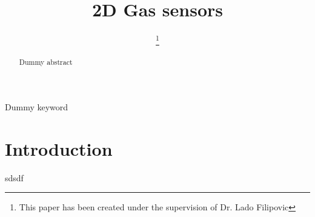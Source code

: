 \documentclass[conference]{IEEEtran}
\begin{document}
\title{2D Gas sensors}

\author{
\thanks{This paper has been created under the supervision of Dr. Lado Filipovic}
}

\maketitle

\begin{abstract}
Dummy abstract
\end{abstract}
\begin{IEEEkeywords}
Dummy keyword
\end{IEEEkeywords}

\section{Introduction}
sdsdf

%
%

\printglossary
\end{document}
